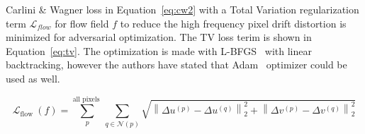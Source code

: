 Carlini \& Wagner loss in Equation~\ref{eq:cw2} with a Total Variation regularization term \(\mathcal{L}_{flow}\) for flow field \(f\) to reduce the high frequency pixel drift distortion is minimized for adversarial optimization. The TV loss terim is shown in Equation~\ref{eq:tv}. The optimization is made with L-BFGS~\cite{liu1989limited} with linear backtracking, however the authors have stated that Adam~\cite{kingma2015adam} optimizer could be used as well.


\begin{equation}
    \label{eq:tv}
    \mathcal{L}_{\text {flow }}(f)=\sum_{p}^{\text {all pixels }} \sum_{q \in \mathcal{N}(p)} \sqrt{\left\|\Delta u^{(p)}-\Delta u^{(q)}\right\|_{2}^{2}+\left\|\Delta v^{(p)}-\Delta v^{(q)}\right\|_{2}^{2}}
\end{equation}





